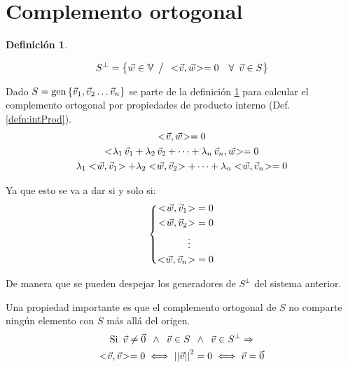 \documentclass[a5paper,12pt,twoside]{book}
\newtheorem{defn}{{Definición}}[chapter]
\begin{document}
\section{Complemento ortogonal}

\begin{mdframed}[style=DefinitionFrame]
    \begin{defn}
        \label{defn:compOrto}
    \end{defn}
    \begin{equation*}
        S^\perp = { \left\{ {\Vec{w} \in \mathbb{V} \hspace{1ex} \big/ \hspace{1ex} <\hspace{-0.8mm}\Vec{v},\Vec{w}\hspace{-0.8mm}> = 0 \quad \forall \enspace \Vec{v} \in S} \right\} }
    \end{equation*}
\end{mdframed}

Dado $S=\operatorname{gen}{ \left\{ {\Vec{v}_1,\Vec{v}_2 \dots \Vec{v}_n} \right\} }$ se parte de la definición \ref{defn:compOrto} para calcular el complemento ortogonal por propiedades de producto interno (Def. \ref{defn:intProd}).
\begin{gather*}
    \intProd{\Vec{v}}{\Vec{w}} = 0
    \\
    \intProd{\lambda_1 \, \Vec{v}_1 + \lambda_2 \, \Vec{v}_2 + \dots + \lambda_\nth \, \Vec{v}_\nth}{\Vec{w}} = 0
    \\
    \lambda_1 \intProd{\Vec{w}}{\Vec{v}_1} + \lambda_2 \intProd{\Vec{w}}{\Vec{v}_2} + \dots + \lambda_\nth \intProd{\Vec{w}}{\Vec{v}_\nth} = 0
\end{gather*}

Ya que esto se va a dar si y solo si:
\begin{equation*}
    \left\{
    \begin{aligned}
        <\hspace{-0.8mm}\Vec{w},\Vec{v}_1\hspace{-0.8mm}> &= 0
        \\
        <\hspace{-0.8mm}\Vec{w},\Vec{v}_2\hspace{-0.8mm}> &= 0
        \\
        \vdots \enspace &
        \\
        <\hspace{-0.8mm}\Vec{w},\Vec{v}_n\hspace{-0.8mm}> &= 0
    \end{aligned}
    \right.
\end{equation*}

De manera que se pueden despejar los generadores de $S^\perp$ del sistema anterior.

Una propiedad importante es que el complemento ortogonal de $S$ no comparte ningún elemento con $S$ más allá del origen.
\begin{gather*}
    \textrm{Si} \enspace \Vec{v} \neq \Vec{0} \enspace \land \enspace \Vec{v} \in S \enspace \land \enspace \Vec{v} \in S^\perp \Rightarrow
    \\
    <\hspace{-0.8mm}\Vec{v},\Vec{v}\hspace{-0.8mm}> = 0 \iff {\left|\left| {\Vec{v}} \right|\right|}^2 = 0 \iff \Vec{v} = \Vec{0}
\end{gather*}
\end{document}
